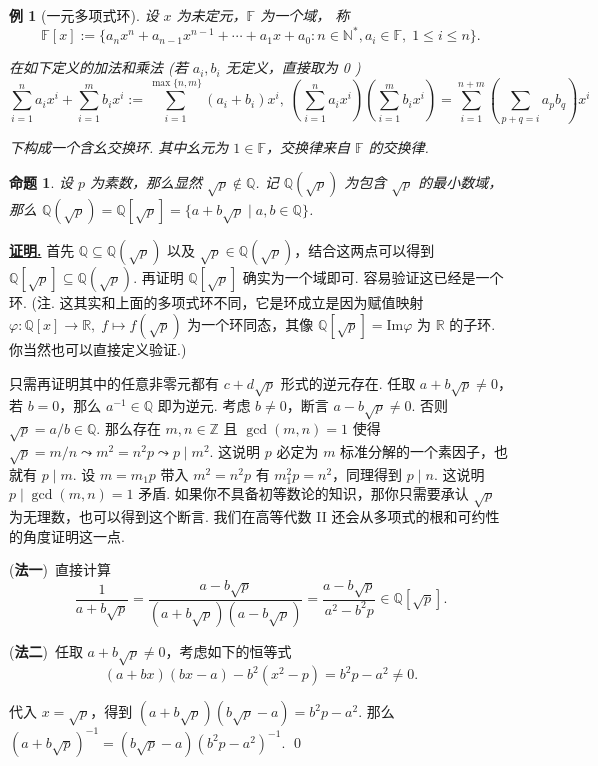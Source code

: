 \documentclass[10pt,openany]{article}
\theoremstyle{thmstyle} %
\theoremstyle{defstyle} %
\theoremstyle{prostyle} %
\newtheorem{proposition}[theorem]{命题}
\newtheorem{example}[theorem]{例}
\renewenvironment{proof}[1][证明]{\par\underline{\textbf{#1.}} \;\fangsong}{\qed\par}
\begin{document}
\begin{example}[一元多项式环]
	设 \( x \) 为未定元，\( \mathbb{F} \) 为一个域， 称
	\[ \mathbb{F}[x]:=\{ a_nx^n+a_{n-1}x^{n-1}+\cdots+a_1x+a_0 : n \in \mathbb{N}^*, a_i \in \mathbb{F}, \; 1 \leq i \leq n \}. \]
	
	在如下定义的加法和乘法 (若 \( a_i, b_i \) 无定义，直接取为 0 )
	\[ \sum_{i=1}^{n} a_ix^i + \sum_{i=1}^{m} b_ix^i:= \sum_{i=1}^{\max\{n,m\}} (a_i+b_i)x^i, \; \left( \sum_{i=1}^{n} a_ix^i \right)\left( \sum_{i=1}^{m} b_ix^i \right)= \sum_{i=1}^{n+m} \left( \sum_{p+q=i}^{} a_pb_q \right) x^i \]
	
	下构成一个含幺交换环. 其中幺元为 \( 1 \in \mathbb{F} \)，交换律来自 \( \mathbb{F} \) 的交换律. 
\end{example}

\begin{proposition}
	设 \( p \) 为素数，那么显然 \( \sqrt{p} \notin \mathbb{Q} \). 记 \( \mathbb{Q}(\sqrt{p}) \) 为包含 \( \sqrt{p} \) 的最小数域，那么 \( \mathbb{Q}(\sqrt{p})=\mathbb{Q}[\sqrt{p}]=\{ a+b\sqrt{p} \mid a,b \in \mathbb{Q} \} \).
	\label{1.2.12}
\end{proposition}

\begin{proof}
	首先 \( \mathbb{Q} \subseteq \mathbb{Q}(\sqrt{p}) \) 以及 \( \sqrt{p} \in \mathbb{Q}(\sqrt{p}) \)，结合这两点可以得到 \( \mathbb{Q}[\sqrt{p}] \subseteq \mathbb{Q}(\sqrt{p}) \). 再证明 \( \mathbb{Q}[\sqrt{p}] \) 确实为一个域即可. 容易验证这已经是一个环. (注. 这其实和上面的多项式环不同，它是环成立是因为赋值映射 \( \varphi: \mathbb{Q}[x] \to \mathbb{R}, \; f \mapsto f(\sqrt{p}) \) 为一个环同态，其像 \( \mathbb{Q}[\sqrt{p}]=\mathrm{Im}\varphi \) 为 \( \mathbb{R} \) 的子环. 你当然也可以直接定义验证.)
	
	 只需再证明其中的任意非零元都有 \( c+d\sqrt{p} \) 形式的逆元存在. 任取 \( a+b\sqrt{p} \neq 0 \)，若 \(  b=0 \)，那么 \( a^{-1} \in \mathbb{Q} \) 即为逆元. 考虑 \( b \neq 0 \)，断言 \( a-b\sqrt{p} \neq 0 \).
     否则 \( \sqrt{p}=a/b \in \mathbb{Q} \). 那么存在 \( m,n \in \mathbb{Z} \) 且 \( \gcd(m,n)=1 \) 使得 \( \sqrt{p}=m/n \leadsto m^2=n^2p \leadsto p\mid m^2\). 这说明 \( p \) 必定为 \( m \) 标准分解的一个素因子，也就有 \( p \mid m \). 设 \( m=m_1p \) 带入 \( m^2=n^2p \) 有 \( m_1^2p=n^2 \)，同理得到 \( p \mid n \). 这说明 \( p \mid \gcd(m,n)=1 \) 矛盾. 如果你不具备初等数论的知识，那你只需要承认 \( \sqrt{p} \) 为无理数，也可以得到这个断言. 我们在高等代数 II 还会从多项式的根和可约性的角度证明这一点.
	
	(\textbf{法一})\ 直接计算
	\[ \frac{1}{a+b\sqrt{p}}=\frac{a-b\sqrt{p}}{(a+b\sqrt{p})(a-b\sqrt{p})}= \frac{a-b\sqrt{p}}{a^2-b^2p} \in \mathbb{Q}[\sqrt{p}]. \]
	
	(\textbf{法二})\ 任取 \( a+b\sqrt{p} \neq 0 \)，考虑如下的恒等式
	\[ (a+bx)(bx-a)-b^2(x^2-p)=b^2p-a^2 \neq 0. \]
	
	代入 \( x=\sqrt{p} \)，得到 \( (a+b\sqrt{p})(b\sqrt{p}-a)=b^2p-a^2 \). 那么 \( (a+b\sqrt{p})^{-1}=(b\sqrt{p}-a)(b^2p-a^2)^{-1} \).
\end{proof}
\end{document}
